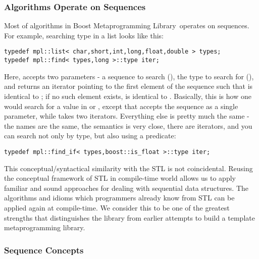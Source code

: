 \documentclass{netobjectdays}
\newcommand{\Mpl}{Boost Meta\-program\-ming Library}
\begin{document}
\subsubsection{Algorithms Operate on Sequences}
  
Most of algorithms in \Mpl\ operates on sequences. For example, 
searching type in a list looks like this:

{\footnotesize
\begin{verbatim}
typedef mpl::list< char,short,int,long,float,double > types;
typedef mpl::find< types,long >::type iter;
\end{verbatim}
}

Here,  accepts two parameters - a sequence to search
(), the type to search for (), and returns an
iterator  pointing to the first element of the sequence
such that  is identical to ; if no such
element exists,  is identical to
. Basically, this is how one would search for a
value in  or , except that
 accepts the sequence as a single parameter,
while  takes two iterators.  Everything else is pretty
much the same - the names are the same, the semantics is very close,
there are iterators, and you can search not only by type, but also
using a predicate:

{\footnotesize
\begin{verbatim}
typedef mpl::find_if< types,boost::is_float >::type iter;
\end{verbatim}
}

This conceptual/syntactical similarity with the STL is not
coincidental. Reusing the conceptual framework of STL in compile-time
world allows us to apply familiar and sound approaches for dealing
with sequential data structures. The algorithms and idioms which
programmers already know from STL can be applied again at
compile-time. We consider this to be one of the greatest strengths
that distinguishes the library from earlier attempts to build a
template metaprogramming library.

\subsubsection{Sequence Concepts}
\end{document}
